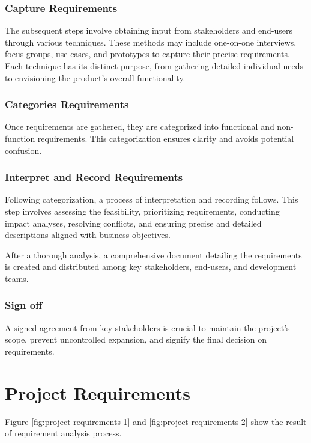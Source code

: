 \subsubsection{Capture Requirements}
The subsequent steps involve obtaining input from stakeholders and end-users through various techniques. These methods may include one-on-one interviews, focus groups, use cases, and prototypes to capture their precise requirements. Each technique has its distinct purpose, from gathering detailed individual needs to envisioning the product's overall functionality.

\subsubsection{Categories Requirements}
Once requirements are gathered, they are categorized into functional and non-function requirements. This categorization ensures clarity and avoids potential confusion.

\subsubsection{Interpret and Record Requirements}
Following categorization, a process of interpretation and recording follows. This step involves assessing the feasibility, prioritizing requirements, conducting impact analyses, resolving conflicts, and ensuring precise and detailed descriptions aligned with business objectives.

After a thorough analysis, a comprehensive document detailing the requirements is created and distributed among key stakeholders, end-users, and development teams.

\subsubsection{Sign off}
A signed agreement from key stakeholders is crucial to maintain the project's scope, prevent uncontrolled expansion, and signify the final decision on requirements.

\section{Project Requirements}
\label{section:project-requirements}

Figure \ref{fig:project-requirements-1} and \ref{fig:project-requirements-2} show the result of requirement analysis process.

